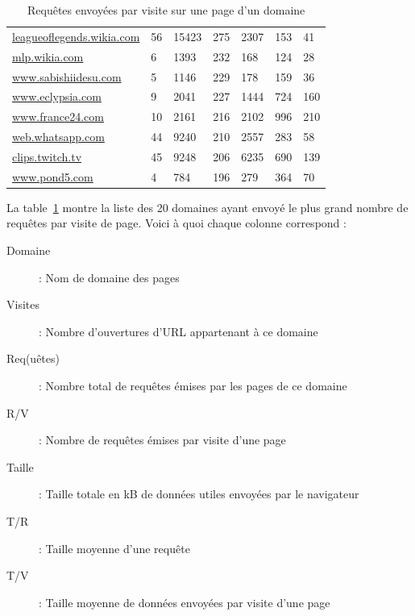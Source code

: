 \begin{table}[h]
\begin{tabular}{lllllll}
\scriptsize \url{leagueoflegends.wikia.com} & 56             & 15423         & 275                            & 2307          & 153                     & 41                        \\
\scriptsize \url{mlp.wikia.com}             & 6              & 1393          & 232                            & 168           & 124                     & 28                        \\
\scriptsize \url{www.sabishiidesu.com}      & 5              & 1146          & 229                            & 178           & 159                     & 36                        \\
\scriptsize \url{www.eclypsia.com}          & 9              & 2041          & 227                            & 1444          & 724                     & 160                       \\
\scriptsize \url{www.france24.com}          & 10             & 2161          & 216                            & 2102          & 996                     & 210                       \\
\scriptsize \url{web.whatsapp.com}          & 44             & 9240          & 210                            & 2557          & 283                     & 58                        \\
\scriptsize \url{clips.twitch.tv}           & 45             & 9248          & 206                            & 6235          & 690                     & 139                       \\
\scriptsize \url{www.pond5.com}             & 4              & 784           & 196                            & 279           & 364                     & 70                        \\                     
\end{tabular}
\caption{Requêtes envoyées par visite sur une page d'un domaine}
\label{trackers-1}
\end{table}

			La table~\ref{trackers-1} montre la liste des 20 domaines ayant envoyé le plus grand nombre de requêtes par visite de page. Voici à quoi chaque colonne correspond :
			\begin{description}
				\item[Domaine] : Nom de domaine des pages
				\item[Visites] : Nombre d'ouvertures d'URL appartenant à ce domaine
				\item[Req(uêtes)] : Nombre total de requêtes émises par les pages de ce domaine
				\item[R/V] : Nombre de requêtes émises par visite d'une page
				\item[Taille] : Taille totale en kB de données utiles envoyées par le navigateur
				\item[T/R] : Taille moyenne d'une requête
				\item[T/V] : Taille moyenne de données envoyées par visite d'une page      
			\end{description}

